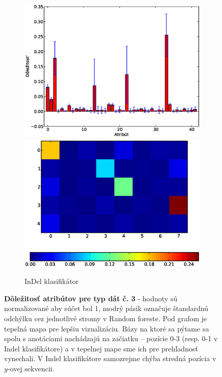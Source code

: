 \begin{figure}[htp]
\begin{subfigure}[t]{0.4\textwidth}
                \includegraphics[width=\textwidth]{images/clf_fi/randomforest_fullcmp_5_indel_bars}
                \includegraphics[width=\textwidth]{images/clf_fi/randomforest_fullcmp_5_indel_heatmap}
                \caption{InDel klasifikátor}
                \label{fig:datatype3-i}
        \end{subfigure}
        \caption[Dôležitosť atribútov pre typ dát č. 3]{
        \textbf{Dôležitosť atribútov pre typ dát č. 3} - hodnoty sú normalizované aby súčet bol 1, modrý pásik označuje štandardnú odchýlku cez jednotlivé stromy v Random foreste.
        Pod grafom je tepelná mapa pre lepšiu vizualizáciu. Bázy na ktoré sa pýtame sa spolu s anotáciami nachádzajú na začiatku -- pozície 0-3 (resp. 0-1 v Indel klasifikátore) a v tepelnej mape sme ich pre prehľadnosť vynechali.
        V Indel klasifikátore samozrejme chýba stredná pozícia v $y$-ovej sekvencii.
        }
        \label{fig:datatype3}
\end{figure}

